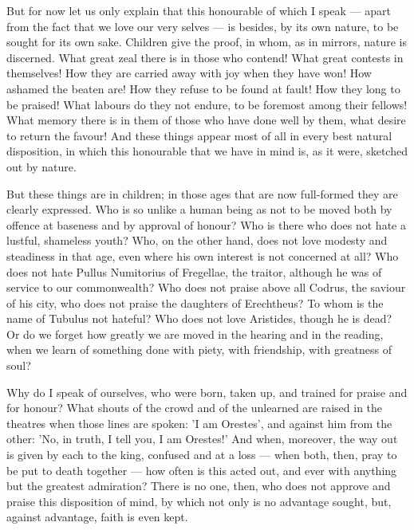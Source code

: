  But for now let us only explain that this honourable of which I speak — apart from the fact that we love our very selves — is besides, by its own nature, to be sought for its own sake. Children give the proof, in whom, as in mirrors, nature is discerned. What great zeal there is in those who contend! What great contests in themselves! How they are carried away with joy when they have won! How ashamed the beaten are! How they refuse to be found at fault! How they long to be praised! What labours do they not endure, to be foremost among their fellows! What memory there is in them of those who have done well by them, what desire to return the favour! And these things appear most of all in every best natural disposition, in which this honourable that we have in mind is, as it were, sketched out by nature.

 But these things are in children; in those ages that are now full-formed they are clearly expressed. Who is so unlike a human being as not to be moved both by offence at baseness and by approval of honour? Who is there who does not hate a lustful, shameless youth? Who, on the other hand, does not love modesty and steadiness in that age, even where his own interest is not concerned at all? Who does not hate Pullus Numitorius of Fregellae, the traitor, although he was of service to our commonwealth? Who does not praise above all Codrus, the saviour of his city, who does not praise the daughters of Erechtheus? To whom is the name of Tubulus not hateful? Who does not love Aristides, though he is dead? Or do we forget how greatly we are moved in the hearing and in the reading, when we learn of something done with piety, with friendship, with greatness of soul?

 Why do I speak of ourselves, who were born, taken up, and trained for praise and for honour? What shouts of the crowd and of the unlearned are raised in the theatres when those lines are spoken: 'I am Orestes', and against him from the other: 'No, in truth, I tell you, I am Orestes!' And when, moreover, the way out is given by each to the king, confused and at a loss — when both, then, pray to be put to death together — how often is this acted out, and ever with anything but the greatest admiration? There is no one, then, who does not approve and praise this disposition of mind, by which not only is no advantage sought, but, against advantage, faith is even kept.

